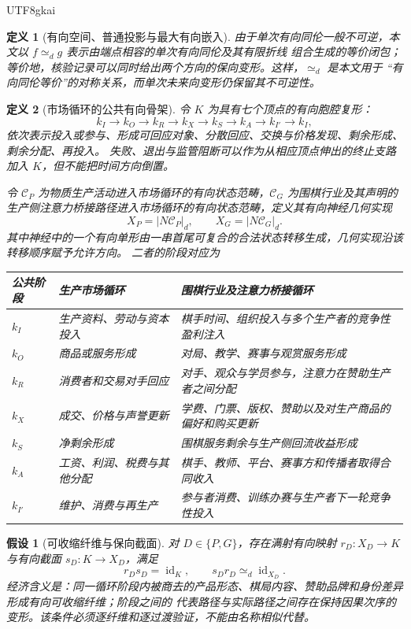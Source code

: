 \documentclass[12pt,a4paper,openany]{report}
\newtheorem{definition}{定义}[chapter]
\newtheorem{assumption}{假设}[chapter]
\begin{document}
\begin{CJK*}{UTF8}{gkai}
\begin{definition}[有向空间、普通投影与最大有向嵌入]
由于单次有向同伦一般不可逆，本文以 \(f\simeq_d g\) 表示由端点相容的单次有向同伦及其有限折线
组合生成的等价闭包；等价地，核验记录可以同时给出两个方向的保向变形。这样，\(\simeq_d\) 是本文用于
“有向同伦等价”的对称关系，而单次未来向变形仍保留其不可逆性。
\end{definition}

\begin{definition}[市场循环的公共有向骨架]
令 \(K\) 为具有七个顶点的有向胞腔复形：
\[
  k_I\to k_O\to k_R\to k_X\to k_S\to k_A\to k_{I'}\to k_I,
\]
依次表示投入或参与、形成可回应对象、分散回应、交换与价格发现、剩余形成、剩余分配、再投入。
失败、退出与监管阻断可以作为从相应顶点伸出的终止支路加入 \(K\)，但不能把时间方向倒置。

令 \(\mathcal C_P\) 为物质生产活动进入市场循环的有向状态范畴，\(\mathcal C_G\) 为围棋行业及其声明的
生产侧注意力桥接路径进入市场循环的有向状态范畴，定义其有向神经几何实现
\[
  X_P=|N\mathcal C_P|_d,
  \qquad
  X_G=|N\mathcal C_G|_d.
\]
其中神经中的一个有向单形由一串首尾可复合的合法状态转移生成，几何实现沿该转移顺序赋予允许方向。
二者的阶段对应为
\begin{center}
\begin{tabular}{p{}p{}p{}}
\toprule
公共阶段 & 生产市场循环 & 围棋行业及注意力桥接循环 \\
\midrule
\(k_I\) & 生产资料、劳动与资本投入 & 棋手时间、组织投入与多个生产者的竞争性盈利注入 \\
\(k_O\) & 商品或服务形成 & 对局、教学、赛事与观赏服务形成 \\
\(k_R\) & 消费者和交易对手回应 & 对手、观众与学员参与，注意力在赞助生产者之间分配 \\
\(k_X\) & 成交、价格与声誉更新 & 学费、门票、版权、赞助以及对生产商品的偏好和购买更新 \\
\(k_S\) & 净剩余形成 & 围棋服务剩余与生产侧回流收益形成 \\
\(k_A\) & 工资、利润、税费与其他分配 & 棋手、教师、平台、赛事方和传播者取得合同收入 \\
\(k_{I'}\) & 维护、消费与再生产 & 参与者消费、训练办赛与生产者下一轮竞争性投入 \\
\bottomrule
\end{tabular}
\end{center}
\end{definition}

\begin{assumption}[可收缩纤维与保向截面]
对 \(D\in\{P,G\}\)，存在满射有向映射 \(r_D:X_D\to K\) 与有向截面
\(s_D:K\to X_D\)，满足
\[
  r_Ds_D=\operatorname{id}_K,
  \qquad
  s_Dr_D\simeq_d\operatorname{id}_{X_D}.
\]
经济含义是：同一循环阶段内被商去的产品形态、棋局内容、赞助品牌和身份差异形成有向可收缩纤维；阶段之间的
代表路径与实际路径之间存在保持因果次序的变形。该条件必须逐纤维和逐过渡验证，不能由名称相似代替。
\end{assumption}


\end{CJK*}
\end{document}
